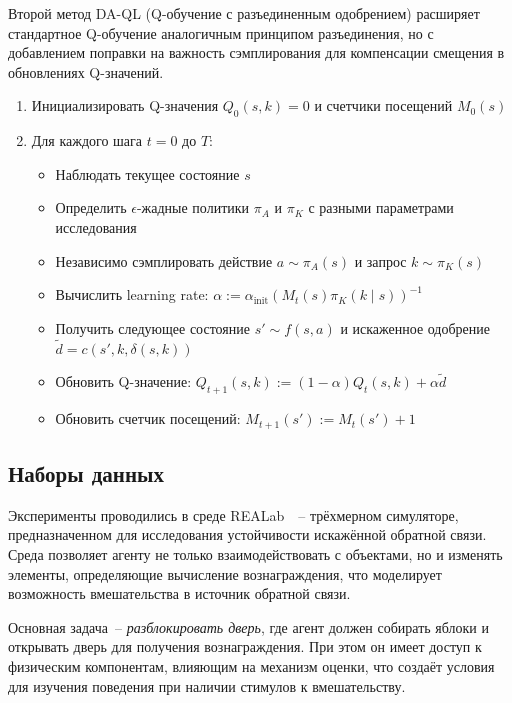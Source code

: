 Второй метод DA-QL (Q-обучение с разъединенным одобрением) расширяет стандартное Q-обучение аналогичным принципом разъединения, но с добавлением поправки на важность сэмплирования для компенсации смещения в обновлениях Q-значений.

\begin{enumerate}
    \item Инициализировать Q-значения $Q_0(s,k) = 0$ и счетчики посещений $M_0(s)$
    \item Для каждого шага $t = 0$ до $T$:
    \begin{itemize}
        \item Наблюдать текущее состояние $s$
        \item Определить $\epsilon$-жадные политики $\pi_A$ и $\pi_K$ с разными параметрами исследования
        \item Независимо сэмплировать действие $a \sim \pi_A(s)$ и запрос $k \sim \pi_K(s)$
        \item Вычислить learning rate: $\alpha := \alpha_{\text{init}}(M_t(s)\pi_K(k \mid s))^{-1}$
        \item Получить следующее состояние $s' \sim f(s,a)$ и искаженное одобрение $\tilde{d} = c(s',k,\delta(s,k))$
        \item Обновить Q-значение: $Q_{t+1}(s,k) := (1-\alpha)Q_t(s,k) + \alpha\tilde{d}$
        \item Обновить счетчик посещений: $M_{t+1}(s') := M_t(s') + 1$
    \end{itemize}
\end{enumerate}


\subsection{Наборы данных}

Эксперименты проводились в среде REALab~\cite{Kumar2020Realab}~-- трёхмерном симуляторе, предназначенном для исследования устойчивости искажённой обратной связи. Среда позволяет агенту не только взаимодействовать с объектами, но и изменять элементы, определяющие вычисление вознаграждения, что моделирует возможность вмешательства в источник обратной связи.

Основная задача~-- \emph{разблокировать дверь}, где агент должен собирать яблоки и открывать дверь для получения вознаграждения. При этом он имеет доступ к физическим компонентам, влияющим на механизм оценки, что создаёт условия для изучения поведения при наличии стимулов к вмешательству.

